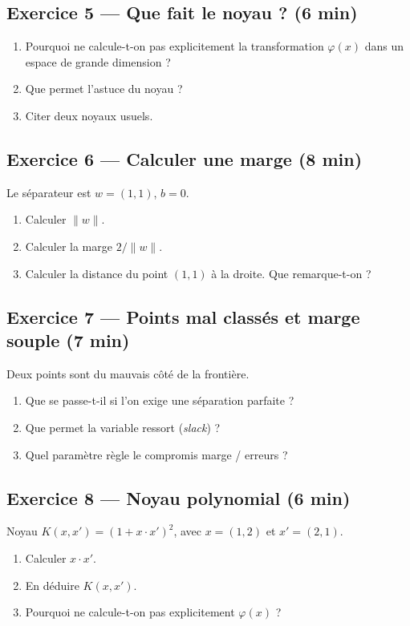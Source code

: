 \subsection*{Exercice 5 --- Que fait le noyau ? \hfill \normalfont\footnotesize (6 min)}
\begin{enumerate}
  \item Pourquoi ne calcule-t-on pas explicitement la transformation
        $\varphi(x)$ dans un espace de grande dimension ?
  \item Que permet l'astuce du noyau ?
  \item Citer deux noyaux usuels.
\end{enumerate}


\subsection*{Exercice 6 --- Calculer une marge \hfill \normalfont\footnotesize (8 min)}
Le séparateur est $w=(1,1)$, $b=0$.
\begin{enumerate}
  \item Calculer $\lVert w\rVert$.
  \item Calculer la marge $2/\lVert w\rVert$.
  \item Calculer la distance du point $(1,1)$ à la droite. Que remarque-t-on ?
\end{enumerate}

\subsection*{Exercice 7 --- Points mal classés et marge souple \hfill \normalfont\footnotesize (7 min)}
Deux points sont du mauvais côté de la frontière.
\begin{enumerate}
  \item Que se passe-t-il si l'on exige une séparation parfaite ?
  \item Que permet la variable ressort (\emph{slack}) ?
  \item Quel paramètre règle le compromis marge / erreurs ?
\end{enumerate}

\subsection*{Exercice 8 --- Noyau polynomial \hfill \normalfont\footnotesize (6 min)}
Noyau $K(x,x')=(1+x\cdot x')^2$, avec $x=(1,2)$ et $x'=(2,1)$.
\begin{enumerate}
  \item Calculer $x\cdot x'$.
  \item En déduire $K(x,x')$.
  \item Pourquoi ne calcule-t-on pas explicitement $\varphi(x)$ ?
\end{enumerate}

